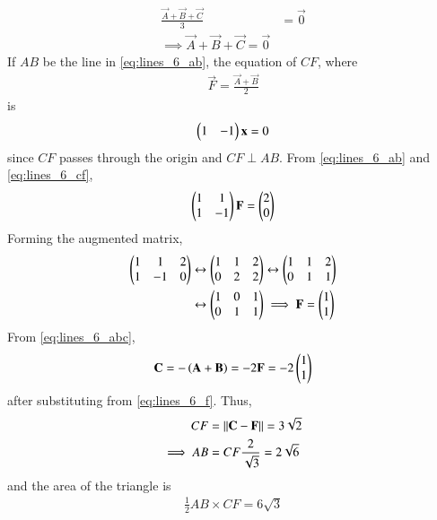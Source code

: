 \begin{enumerate}[label=\arabic*.,ref=\thesubsection.\theenumi]
\begin{align}
\frac{\vec{A}+\vec{B}+\vec{C}}{3} &= \vec{0}
\nonumber \\
\implies 
\vec{A}+\vec{B}+\vec{C} = \vec{0}
\label{eq:lines_6_abc}
\end{align}
%
If $AB$ be the line in \eqref{eq:lines_6_ab},
the equation of 
$CF$, where 
\begin{align}
\vec{F} = \frac{\vec{A}+\vec{B}}{2} 
\end{align}
is 
%
\begin{align}
\label{eq:lines_6_cf}
\begin{pmatrix}1 & -1\end{pmatrix}\mathbf{x} = 0
\end{align}
since $CF$ passes through the origin and $CF\perp AB$. From \eqref{eq:lines_6_ab}
and \eqref{eq:lines_6_cf},
\begin{align}
\label{eq:lines_6_fmat}
\begin{pmatrix}1 & 1 \\1 & -1\end{pmatrix}\mathbf{F} = \begin{pmatrix}2 \\ 0\end{pmatrix}
\end{align}
%
Forming the augmented matrix, 
\begin{align}
\begin{pmatrix}1 & 1 &2 \\1 & -1 & 0\end{pmatrix} &\leftrightarrow \begin{pmatrix}1 & 1 &2 \\0 & 2 & 2\end{pmatrix} \leftrightarrow \begin{pmatrix}1 & 1 &2 \\0 & 1 & 1\end{pmatrix} 
\nonumber \\
&\leftrightarrow \begin{pmatrix}1 & 0 &1 \\0 & 1 & 1\end{pmatrix} \implies \mathbf{F} = \begin{pmatrix}1 \\ 1\end{pmatrix}
\label{eq:lines_6_f}
\end{align}
From \eqref{eq:lines_6_abc},
\begin{align}
\mathbf{C}=-\left(\mathbf{A}+\mathbf{B}\right)=-2\mathbf{F} = -2\begin{pmatrix}1 \\ 1\end{pmatrix}
\label{eq:lines_6_c}
\end{align}
after substituting from \eqref{eq:lines_6_f}.  Thus, 
\begin{align}
CF &= \left\lVert\mathbf{C}-\mathbf{F}\right\rVert = 3\sqrt{2} 
\\
\implies AB &=  CF\frac{2}{\sqrt{3}} = 2\sqrt{6}
\label{eq:lines_6_cflen}
\end{align}
and the area of the triangle is 
\begin{align}
\frac{1}{2} AB \times CF = 6\sqrt{3}
\end{align}



\end{enumerate}
